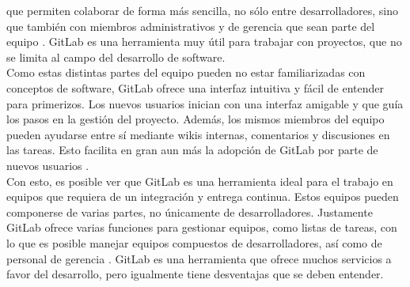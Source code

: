 \documentclass[runningheads]{llncs}
\begin{document}
que permiten colaborar de forma más sencilla, no sólo entre desarrolladores, sino que también con miembros administrativos y de gerencia que
sean parte del equipo \cite{choudhury2020gitlab}. GitLab es una herramienta muy útil para trabajar con proyectos, que no se limita al campo del
desarrollo de software.\\
Como estas distintas partes del equipo pueden no estar familiarizadas con conceptos de software, GitLab ofrece una interfaz intuitiva y fácil
de entender para primerizos. Los nuevos usuarios inician con una interfaz amigable y que guía los pasos en la gestión del proyecto. Además, los
mismos miembros del equipo pueden ayudarse entre sí mediante wikis internas, comentarios y discusiones en las tareas. Esto facilita en gran
aun más la adopción de GitLab por parte de nuevos usuarios \cite{uddin2023comparative}.\\
Con esto, es posible ver que GitLab es una herramienta ideal para el trabajo en equipos que requiera de un integración y entrega continua. Estos
equipos pueden componerse de varias partes, no únicamente de desarrolladores. Justamente GitLab ofrece varias funciones para gestionar equipos,
como listas de tareas, con lo que es posible manejar equipos compuestos de desarrolladores, así como de personal de gerencia \cite{choudhury2020gitlab}.
GitLab es una herramienta que ofrece muchos servicios a favor del desarrollo, pero igualmente tiene desventajas que se deben entender.
\end{document}
